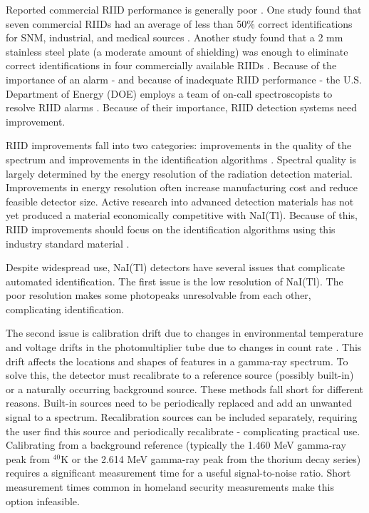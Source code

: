 Reported commercial RIID performance is generally poor \cite{pibida2004,blackadar2003,blackadar2004}. One study found that seven commercial RIIDs had an average of less than 50\% correct identifications for SNM, industrial, and medical sources \cite{blackadar2003}. Another study found that a 2 mm stainless steel plate (a moderate amount of shielding) was enough to eliminate correct identifications in four commercially available RIIDs \cite{pibida2004}. Because of the importance of an alarm - and because of inadequate RIID performance - the U.S. Department of Energy (DOE) employs a team of on-call spectroscopists to resolve RIID alarms \cite{burr2009}. Because of their importance, RIID detection systems need improvement.


RIID improvements fall into two categories: improvements in the quality of the spectrum and improvements in the identification algorithms \cite{swoboda2004}. Spectral quality is largely determined by the energy resolution of the radiation detection material. Improvements in energy resolution often increase manufacturing cost and reduce feasible detector size. Active research into advanced detection materials has not yet produced a material economically competitive with NaI(Tl). Because of this, RIID improvements should focus on the identification algorithms using this industry standard material \cite{blackadar2003}.


Despite widespread use, NaI(Tl) detectors have several issues that complicate automated identification. The first issue is the low resolution of NaI(Tl). The poor resolution makes some photopeaks unresolvable from each other, complicating identification.

The second issue is calibration drift due to changes in environmental temperature and voltage drifts in the photomultiplier tube due to changes in count rate \cite{knoll,gilmore}. This drift affects the locations and shapes of features in a gamma-ray spectrum. To solve this, the detector must recalibrate to a reference source (possibly built-in) or a naturally occurring background source. These methods fall short for different reasons. Built-in sources need to be periodically replaced and add an unwanted signal to a spectrum. Recalibration sources can be included separately, requiring the user find this source and periodically recalibrate - complicating practical use. Calibrating from a background reference (typically the 1.460 MeV gamma-ray peak from $^{40}$K or the 2.614 MeV gamma-ray peak from the thorium decay series) requires a significant measurement time for a useful signal-to-noise ratio. Short measurement times common in homeland security measurements make this option infeasible.

